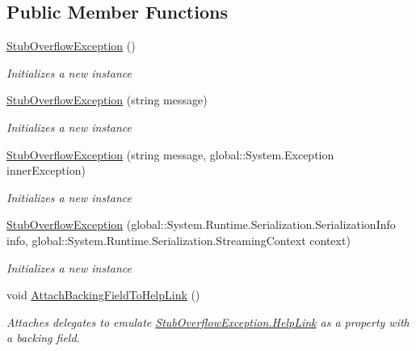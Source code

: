 \subsection*{Public Member Functions}
\begin{DoxyCompactItemize}
\item 
\hyperlink{class_system_1_1_fakes_1_1_stub_overflow_exception_a13293b7a5d56a68dafdac58be817184a}{Stub\-Overflow\-Exception} ()
\begin{DoxyCompactList}\small\item\em Initializes a new instance\end{DoxyCompactList}\item 
\hyperlink{class_system_1_1_fakes_1_1_stub_overflow_exception_a513e771362395a041f892d7fcc66d98f}{Stub\-Overflow\-Exception} (string message)
\begin{DoxyCompactList}\small\item\em Initializes a new instance\end{DoxyCompactList}\item 
\hyperlink{class_system_1_1_fakes_1_1_stub_overflow_exception_aa671358dadaf6446bc99add234cc6765}{Stub\-Overflow\-Exception} (string message, global\-::\-System.\-Exception inner\-Exception)
\begin{DoxyCompactList}\small\item\em Initializes a new instance\end{DoxyCompactList}\item 
\hyperlink{class_system_1_1_fakes_1_1_stub_overflow_exception_a9261cee0d2ea31277e3d85eaf428ebbf}{Stub\-Overflow\-Exception} (global\-::\-System.\-Runtime.\-Serialization.\-Serialization\-Info info, global\-::\-System.\-Runtime.\-Serialization.\-Streaming\-Context context)
\begin{DoxyCompactList}\small\item\em Initializes a new instance\end{DoxyCompactList}\item 
void \hyperlink{class_system_1_1_fakes_1_1_stub_overflow_exception_a0e4d90f159cdc9f4e936231d261a3ec7}{Attach\-Backing\-Field\-To\-Help\-Link} ()
\begin{DoxyCompactList}\small\item\em Attaches delegates to emulate \hyperlink{class_system_1_1_fakes_1_1_stub_overflow_exception_a58657af30f281c300ca005aa9e07e070}{Stub\-Overflow\-Exception.\-Help\-Link} as a property with a backing field.\end{DoxyCompactList}\item 

\end{DoxyCompactItemize}
